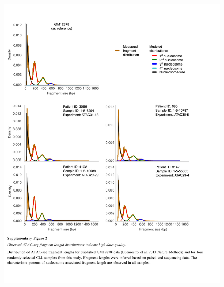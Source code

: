 \documentclass[10pt,]{article}
\begin{document}
\begin{figure}
\centering
\includegraphics[width=1.000\hsize]{figures/Supplementary_Information_02.pdf}
\end{figure}
\clearpage
\end{document}
